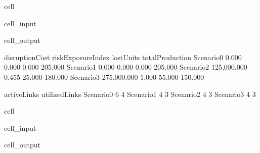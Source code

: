 \documentclass[letterpaper,10pt,english]{jupyterBook}
\begin{document}
\begin{sphinxuseclass}{cell}
\begin{sphinxVerbatimInput}
\begin{sphinxuseclass}{cell_input}
\end{sphinxuseclass}\end{sphinxVerbatimInput}
\begin{sphinxVerbatimOutput}

\begin{sphinxuseclass}{cell_output}
\begin{sphinxVerbatim}[commandchars=\\\{\}]
           disruptionCost riskExposureIndex lostUnits totalProduction  \PYGZbs{}
Scenario\PYGZus{}0          0.000             0.000     0.000         205.000   
Scenario\PYGZus{}1          0.000             0.000     0.000         205.000   
Scenario\PYGZus{}2    125,000.000             0.455    25.000         180.000   
Scenario\PYGZus{}3    275,000.000             1.000    55.000         150.000   

           activeLinks utilizedLinks  
Scenario\PYGZus{}0           6             4  
Scenario\PYGZus{}1           4             3  
Scenario\PYGZus{}2           4             3  
Scenario\PYGZus{}3           4             3  
\end{sphinxVerbatim}

\end{sphinxuseclass}\end{sphinxVerbatimOutput}

\end{sphinxuseclass}
\begin{sphinxuseclass}{cell}\begin{sphinxVerbatimInput}

\begin{sphinxuseclass}{cell_input}
\begin{sphinxVerbatim}[commandchars=\\\{\}]
\PYG{p}{[}\PYG{p}{]}
\end{sphinxVerbatim}

\end{sphinxuseclass}\end{sphinxVerbatimInput}
\begin{sphinxVerbatimOutput}

\begin{sphinxuseclass}{cell_output}
\noindent{}

\end{sphinxuseclass}\end{sphinxVerbatimOutput}

\end{sphinxuseclass}
\end{document}
